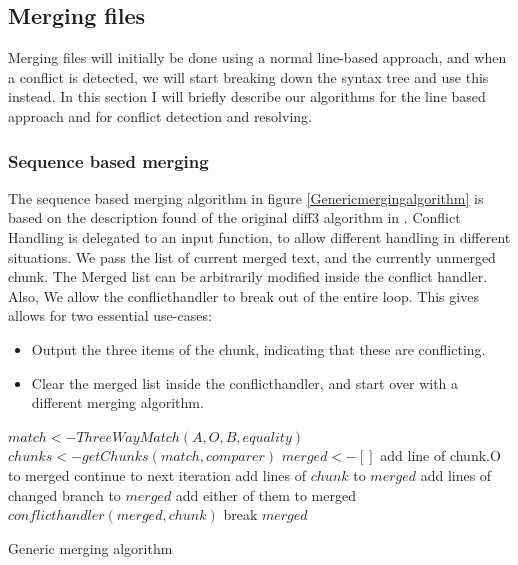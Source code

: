 \documentclass[11pt]{article}
\begin{document}
\subsection{Merging files}
Merging files will initially be done using a normal line-based approach, and when a conflict is detected, we will start breaking down the syntax tree and use this instead. In this section I will briefly describe our algorithms for the line based approach and for conflict detection and resolving.

\subsubsection{Sequence based merging}
The sequence based merging algorithm in figure \ref{Genericmergingalgorithm} is based on the description found of the original diff3 algorithm in \citet{Khanna}. Conflict Handling is delegated to an input function, to allow different handling in different situations. We pass the list of current merged text, and the currently unmerged chunk. The Merged list can be arbitrarily modified inside the conflict handler. Also, We allow the conflicthandler to break out of the entire loop. This gives allows for two essential use-cases:

\begin{itemize}
   \item Output the three items of the chunk, indicating that these are conflicting.
   \item Clear the merged list inside the conflicthandler, and start over with a different merging algorithm.
\end{itemize}


\begin{algorithm}
\begin{algorithmic}
   \State $match  <- ThreeWayMatch(A, O, B, equality)$
   \State $chunks <- getChunks(match, comparer)$
   \State $merged <- []$
            \State add line of chunk.O to merged
            \State continue to next iteration
        \EndIf
            \State add lines of $chunk$ to $merged$
        \ElsIf
               \State add lines of changed branch to $merged$
            \ElsIf
                   \State add either of them to merged
                \ElsIf
                   \State $conflicthandler(merged, chunk)$
                      \State break
                   \EndIf
                \EndIf
			\EndIf
   		\EndIf
    \EndFor
	\State \Return $merged$
\EndFunction


\end{algorithmic}
\caption{Generic merging algorithm}
  \label{Genericmergingalgorithm}
\end{algorithm}
\end{document}
